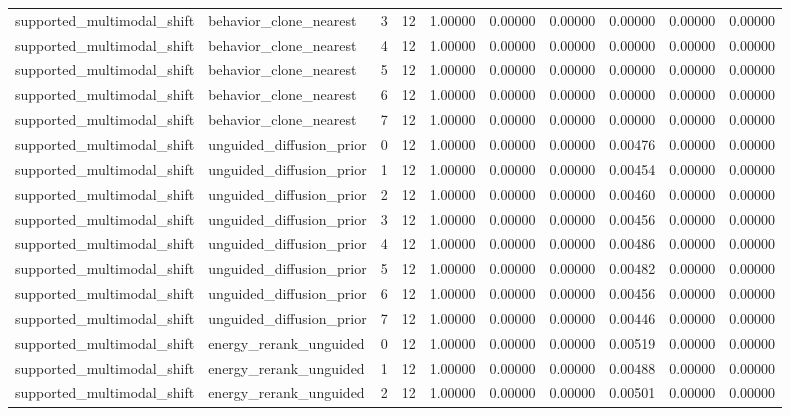 \documentclass{article}
\begin{document}
\begin{table}[tbp]
{\begin{tabular}{llllllllll}
supported\_multimodal\_shift & behavior\_clone\_nearest & 3 & 12 & 1.00000 & 0.00000 & 0.00000 & 0.00000 & 0.00000 & 0.00000 \\
supported\_multimodal\_shift & behavior\_clone\_nearest & 4 & 12 & 1.00000 & 0.00000 & 0.00000 & 0.00000 & 0.00000 & 0.00000 \\
supported\_multimodal\_shift & behavior\_clone\_nearest & 5 & 12 & 1.00000 & 0.00000 & 0.00000 & 0.00000 & 0.00000 & 0.00000 \\
supported\_multimodal\_shift & behavior\_clone\_nearest & 6 & 12 & 1.00000 & 0.00000 & 0.00000 & 0.00000 & 0.00000 & 0.00000 \\
supported\_multimodal\_shift & behavior\_clone\_nearest & 7 & 12 & 1.00000 & 0.00000 & 0.00000 & 0.00000 & 0.00000 & 0.00000 \\
supported\_multimodal\_shift & unguided\_diffusion\_prior & 0 & 12 & 1.00000 & 0.00000 & 0.00000 & 0.00476 & 0.00000 & 0.00000 \\
supported\_multimodal\_shift & unguided\_diffusion\_prior & 1 & 12 & 1.00000 & 0.00000 & 0.00000 & 0.00454 & 0.00000 & 0.00000 \\
supported\_multimodal\_shift & unguided\_diffusion\_prior & 2 & 12 & 1.00000 & 0.00000 & 0.00000 & 0.00460 & 0.00000 & 0.00000 \\
supported\_multimodal\_shift & unguided\_diffusion\_prior & 3 & 12 & 1.00000 & 0.00000 & 0.00000 & 0.00456 & 0.00000 & 0.00000 \\
supported\_multimodal\_shift & unguided\_diffusion\_prior & 4 & 12 & 1.00000 & 0.00000 & 0.00000 & 0.00486 & 0.00000 & 0.00000 \\
supported\_multimodal\_shift & unguided\_diffusion\_prior & 5 & 12 & 1.00000 & 0.00000 & 0.00000 & 0.00482 & 0.00000 & 0.00000 \\
supported\_multimodal\_shift & unguided\_diffusion\_prior & 6 & 12 & 1.00000 & 0.00000 & 0.00000 & 0.00456 & 0.00000 & 0.00000 \\
supported\_multimodal\_shift & unguided\_diffusion\_prior & 7 & 12 & 1.00000 & 0.00000 & 0.00000 & 0.00446 & 0.00000 & 0.00000 \\
supported\_multimodal\_shift & energy\_rerank\_unguided & 0 & 12 & 1.00000 & 0.00000 & 0.00000 & 0.00519 & 0.00000 & 0.00000 \\
supported\_multimodal\_shift & energy\_rerank\_unguided & 1 & 12 & 1.00000 & 0.00000 & 0.00000 & 0.00488 & 0.00000 & 0.00000 \\
supported\_multimodal\_shift & energy\_rerank\_unguided & 2 & 12 & 1.00000 & 0.00000 & 0.00000 & 0.00501 & 0.00000 & 0.00000 \\

\end{tabular}}
\end{table}
\end{document}
